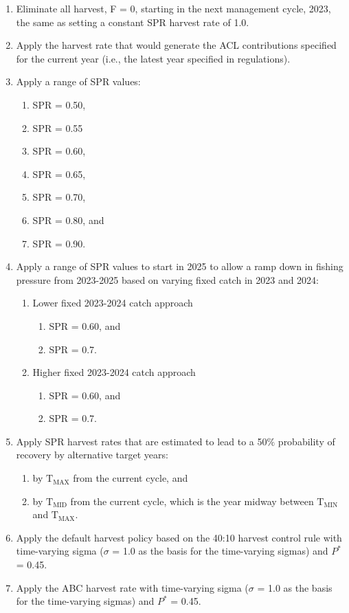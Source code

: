\documentclass[11pt,
  english,
  letterpaper,
]{article}
\begin{document}
\leavevmode\tagmcend\tagstructend\par

\begin{enumerate}
    \item Eliminate all harvest, F = 0, starting in the next management cycle, 2023, the same as setting a constant SPR harvest rate of 1.0.
    \item Apply the harvest rate that would generate the ACL contributions specified for the current year (i.e., the latest year specified in regulations). 
    \item Apply a range of SPR values: 
    \begin{enumerate}
     \item SPR = 0.50,
     \item SPR = 0.55
     \item SPR = 0.60,
     \item SPR = 0.65,
     \item SPR = 0.70,
     \item SPR = 0.80, and
     \item SPR = 0.90. 
    \end{enumerate}
    \item Apply a range of SPR values to start in 2025 to allow a ramp down in fishing pressure from 2023-2025 based on varying fixed catch in 2023 and 2024:
    \begin{enumerate}
     \item Lower fixed 2023-2024 catch approach
      \begin{enumerate}
       \item SPR = 0.60, and
       \item SPR = 0.7.
      \end{enumerate}
   \item Higher fixed 2023-2024 catch approach
    \begin{enumerate}
     \item SPR = 0.60, and
     \item SPR = 0.7.
    \end{enumerate}
    \end{enumerate}
    \item Apply SPR harvest rates that are estimated to lead to a 50$\%$ probability of recovery by alternative target years: 
    \begin{enumerate}
     \item by $\text{T}_\text{MAX}$ from the current cycle, and 
     \item by $\text{T}_\text{MID}$ from the current cycle, which is the year midway between $\text{T}_\text{MIN}$ and $\text{T}_\text{MAX}$.
    \end{enumerate}
    \item Apply the default harvest policy based on the 40:10 harvest control rule with time-varying sigma ($\sigma$ = 1.0 as the basis for the time-varying sigmas) and $P^*$ = 0.45.
    \item Apply the ABC harvest rate with time-varying sigma ($\sigma$ = 1.0 as the basis for the time-varying sigmas) and $P^*$ = 0.45.
\end{enumerate}
\end{document}
